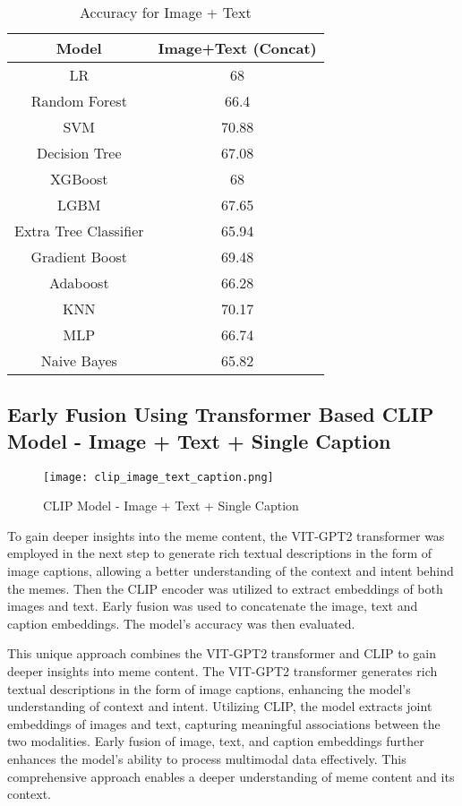 \documentclass{ieeeaccess}
\begin{document}
\begin{table}[htbp]
\caption{Accuracy for Image + Text}
\label{tab:image_text_accuracy}
\centering
\begin{tabular}{|c|c|}
\hline
\textbf{Model} & \textbf{Image+Text (Concat)} \\
\hline
LR & 68 \\
Random Forest & 66.4 \\
SVM & 70.88 \\
Decision Tree & 67.08 \\
XGBoost & 68 \\
LGBM & 67.65 \\
Extra Tree Classifier & 65.94 \\
Gradient Boost & 69.48 \\
Adaboost & 66.28 \\
KNN & 70.17 \\
MLP & 66.74 \\
Naive Bayes & 65.82 \\
\hline
\end{tabular}
\end{table}

\subsection{Early Fusion Using Transformer Based CLIP Model - Image + Text + Single Caption}

\begin{figure}[htbp]
\centering
\texttt{[image: clip\_image\_text\_caption.png]}
\caption{CLIP Model - Image + Text + Single Caption}
\label{fig:clip_image_text_caption}
\end{figure}

To gain deeper insights into the meme content, the VIT-GPT2 transformer was employed in the next step to generate rich textual descriptions in the form of image captions, allowing a better understanding of the context and intent behind the memes. Then the CLIP encoder was utilized to extract embeddings of both images and text. Early fusion was used to concatenate the image, text and caption embeddings. The model's accuracy was then evaluated.

This unique approach combines the VIT-GPT2 transformer and CLIP to gain deeper insights into meme content. The VIT-GPT2 transformer generates rich textual descriptions in the form of image captions, enhancing the model's understanding of context and intent. Utilizing CLIP, the model extracts joint embeddings of images and text, capturing meaningful associations between the two modalities. Early fusion of image, text, and caption embeddings further enhances the model's ability to process multimodal data effectively. This comprehensive approach enables a deeper understanding of meme content and its context.
\end{document}

